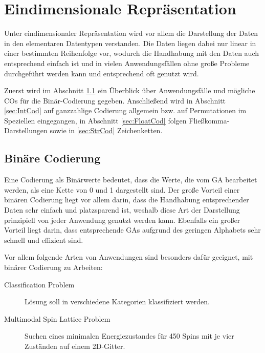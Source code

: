 
\section{Eindimensionale Repräsentation}
\label{sec:EindimRep}

Unter eindimensionaler Repräsentation wird vor allem die Darstellung der Daten in den elementaren Datentypen verstanden. Die Daten liegen dabei nur linear in einer bestimmten Reihenfolge vor, wodurch die Handhabung mit den Daten auch entsprechend einfach ist und in vielen Anwendungsfällen ohne große Probleme durchgeführt werden kann und entsprechend oft genutzt wird.

Zuerst wird im Abschnitt \ref{sec:BinCod} ein Überblick über Anwendungsfälle und mög\-liche COs für die Binär-Codierung gegeben. Anschließend wird in Abschnitt \ref{sec:IntCod} auf ganzzahlige Codierung allgemein bzw. auf Permutationen im Speziellen eingegangen, in Abschnitt \ref{sec:FloatCod} folgen Fließkomma-Darstellungen sowie in \ref{sec:StrCod} Zeichenketten.

\subsection{Binäre Codierung}
\label{sec:BinCod}

	Eine Codierung als Binärwerte bedeutet, dass die Werte, die vom GA bearbeitet werden, als eine Kette von 0 und 1 dargestellt sind. Der große Vorteil einer binären Codierung liegt vor allem darin, dass die Handhabung entsprechender Daten sehr einfach und platzsparend ist, weshalb diese Art der Darstellung prinzipiell von jeder Anwendung genutzt werden kann. Ebenfalls ein großer Vorteil liegt darin, dass entsprechende GAs aufgrund des geringen Alphabets sehr schnell und effizient sind.\cite{TacklingRealCodedGA}
	
	Vor allem folgende Arten von Anwendungen sind besonders dafür geeignet, mit binärer Codierung zu Arbeiten:\cite{Survey}
	\begin{description}
		\item[Classification Problem] Lösung soll in verschiedene Kategorien klassifiziert werden. \cite{NearestNeighborClassifier}
		\item[Multimodal Spin Lattice Problem] Suchen eines minimalen Ener\-gie\-zu\-stan\-des für 450 Spins mit je vier Zuständen auf einem 2D-Gitter. \cite{SelectionSchemesSpatialIsolation}
	\end{description}
	
